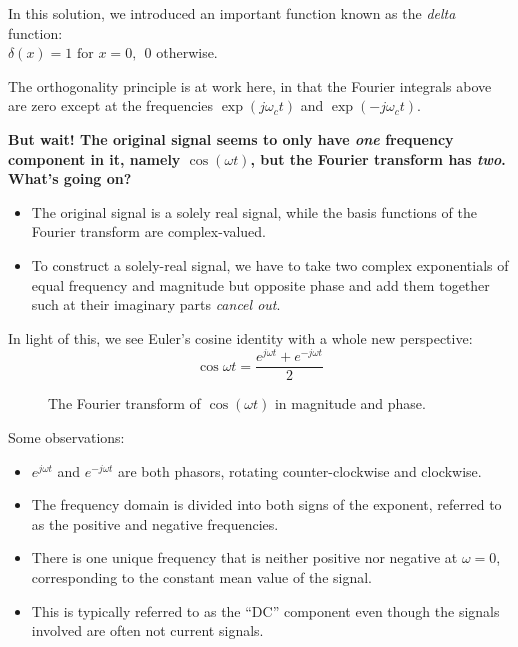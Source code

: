 \documentclass[11pt]{report}
\begin{document}
In this solution, we introduced an important function known as the
\textit{delta} function:\\
$\delta(x) = 1 \text { for } x=0, ~~0$ otherwise.

The orthogonality principle is at work here, in that the Fourier
integrals above are zero except at the frequencies $\exp(j\omega_c t)$
and $\exp(-j\omega_c t)$.

\textbf{But wait! The original signal seems to only have \textit{one} frequency
component in it, namely $\cos(\omega t)$, but the Fourier transform
has \textit{two}.  What's going on?}

\begin{itemize}
\item The original signal is a solely real signal, while
the basis functions of the Fourier transform are complex-valued.

\item To construct a solely-real signal, we have to take two complex
exponentials of equal frequency and magnitude but opposite phase and
add them together such at their imaginary parts \textit{cancel out}.
\end{itemize}

In light of this, we see Euler's cosine identity with a whole new perspective:
\begin{equation*}
\cos \omega t = \frac{e^{j \omega t} + e^{-j \omega t}}{2}
\end{equation*}

\begin{figure*}[ht]
\centering
\epsfxsize=5.0in
\caption{The Fourier transform of $\cos(\omega t)$ in magnitude and phase.}
\label{fig:cos_ft}
\end{figure*}

Some observations: 
\begin{itemize}
\item $e^{j \omega t}$ and $e^{-j \omega t}$ are both phasors, rotating
counter-clockwise and clockwise. 
\item The frequency domain is divided into
both signs of the exponent, referred to as the positive and negative
frequencies. 
\item There is one unique frequency that is neither positive nor
negative at $\omega
= 0$, corresponding to the constant mean value of the signal.  
\item This is typically
referred to as the ``DC'' component even though the signals involved are often not
current signals.
\end{itemize}
\end{document}
